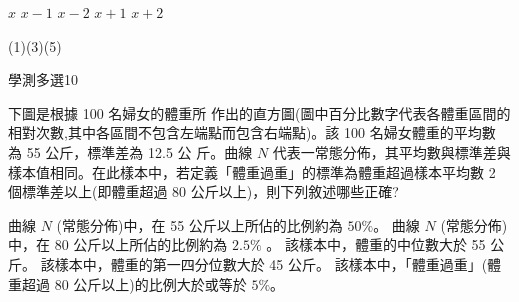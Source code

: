 \begin{QUESTIONS}
\begin{QUESTION}
\begin{QBODY}
			\begin{QOPSINONELINE} 
				\QOP $x$    \QOP $x-1$    \QOP $x-2$    \QOP $x+1$    \QOP $x+2$
			\end{QOPSINONELINE}
        \end{QBODY}
        \begin{QFROMS}
        \end{QFROMS}
        \begin{QTAGS}\end{QTAGS}
        \begin{QANS}
            (1)(3)(5)
        \end{QANS}
        \begin{QSOLLIST}
        \end{QSOLLIST}
        \begin{QEMPTYSPACE}
        \end{QEMPTYSPACE}
    \end{QUESTION}
    \begin{QUESTION}
        \begin{ExamInfo}{95}{學測}{多選}{10}
        \end{ExamInfo}
        \begin{ExamAnsRateInfo}{27}{48}{23}{10}
        \end{ExamAnsRateInfo}
        \begin{QBODY}
            下圖是根據 100 名婦女的體重所 作出的直方圖(圖中百分比數字代表各體重區間的相對次數,其中各區間不包含左端點而包含右端點)。該 100 名婦女體重的平均數 為 55 公斤，標準差為 12.5 公 斤。曲線 $N$ 代表一常態分佈，其平均數與標準差與樣本值相同。在此樣本中，若定義「體重過重」的標準為體重超過樣本平均數 2 個標準差以上(即體重超過 80 公斤以上)，則下列敘述哪些正確? 
			\begin{QOPS} 
				\QOP 曲線 $N$ (常態分佈)中，在 55 公斤以上所佔的比例約為 $50\%$。 
				\QOP 曲線 $N$ (常態分佈)中，在 80 公斤以上所佔的比例約為 $2.5\%$ 。  
				\QOP 該樣本中，體重的中位數大於 55 公斤。 
				\QOP 該樣本中，體重的第一四分位數大於 45 公斤。 
				\QOP 該樣本中，「體重過重」(體重超過 80 公斤以上)的比例大於或等於 $5\%$。
			\end{QOPS}
			

\end{QBODY}
\end{QUESTION}
\end{QUESTIONS}
